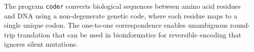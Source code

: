 The program \texttt{coder} converts biological sequences between amino
acid residues and DNA using a non-degenerate genetic code, where each
residue maps to a single unique codon. The one-to-one correspondence
enables unambiguous round-trip translation that can be used in
bioinformatics for reversible encoding that ignores silent mutations.
